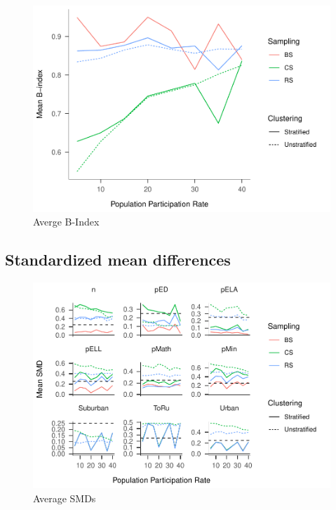 \documentclass[man,floatsintext]{apa6}
\begin{document}
\begin{figure}
\centering
\includegraphics{Results_files/figure-latex/unnamed-chunk-5-1.pdf}
\caption{\label{fig:unnamed-chunk-5}Averge B-Index}
\end{figure}

\hypertarget{standardized-mean-differences}{%
\subsection{Standardized mean differences}\label{standardized-mean-differences}}

\begin{figure}
\centering
\includegraphics{Results_files/figure-latex/unnamed-chunk-6-1.pdf}
\caption{\label{fig:unnamed-chunk-6}Average SMDs}
\end{figure}
\end{document}
